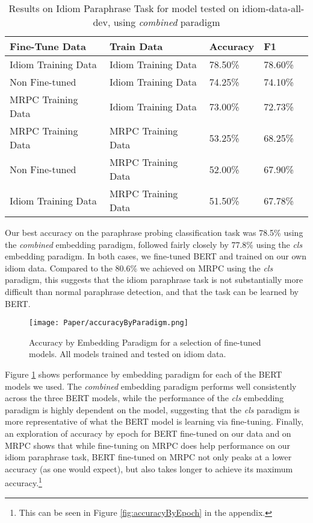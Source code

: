 \documentclass[11pt,a4paper]{article}
\begin{document}
\begin{table*}[h]
\centering
\label{table1}
\begin{small}
\begin{tabular}{|l|l|l|l|l|} \hline
\textbf{Fine-Tune Data} & \textbf{Train Data} &  \textbf{Accuracy} & \textbf{F1} \\ \hline
Idiom Training Data  &Idiom Training Data & 78.50\% &78.60\% \\ \hline
Non Fine-tuned  &Idiom Training Data& 74.25\%&74.10\% \\ \hline
MRPC Training Data &Idiom Training Data&73.00\%&72.73\% \\ \hline
MRPC Training Data &MRPC Training Data&53.25\%&68.25\% \\ \hline
Non Fine-tuned &MRPC Training Data&52.00\%&67.90\% \\ \hline
Idiom Training Data &MRPC Training Data&51.50\%&67.78\% \\ \hline
\end{tabular}
\end{small}
\caption{Results on Idiom Paraphrase Task for model tested on idiom-data-all-dev, using \textit{combined} paradigm}
\label{tab:paraphraseResultTable}
\end{table*}
 Our best accuracy on the paraphrase probing classification task was 78.5\% using the \textit{combined} embedding paradigm, followed fairly closely by 77.8\% using the \textit{cls} embedding paradigm. In both cases, we fine-tuned BERT and trained on our own idiom data. Compared to the 80.6\% we achieved on MRPC using the \textit{cls} paradigm, this suggests that the idiom paraphrase task is not substantially more difficult than normal paraphrase detection, and that the task can be learned by BERT.
 
\begin{figure}[h]
    \texttt{[image: Paper/accuracyByParadigm.png]}
    \centering
        \caption{Accuracy by Embedding Paradigm for a selection of fine-tuned models.  All models trained and tested on idiom data.}
    \label{fig:accuracyByParadigm}
\end{figure} 
 
 
 Figure \ref{fig:accuracyByParadigm} shows performance by embedding paradigm for each of the BERT models we used. The \textit{combined} embedding paradigm performs well consistently across the three BERT models, while the performance of the \textit{cls} embedding paradigm is highly dependent on the model, suggesting that the \textit{cls} paradigm is more representative of what the BERT model is learning via fine-tuning. Finally, an exploration of accuracy by epoch for BERT fine-tuned on our data and on MRPC shows that while fine-tuning on MRPC does help performance on our idiom paraphrase task, BERT fine-tuned on MRPC not only peaks at a lower accuracy (as one would expect), but also takes longer to achieve its maximum accuracy.\footnote{This can be seen in Figure \ref{fig:accuracyByEpoch} in the appendix.}
 
\end{document}
